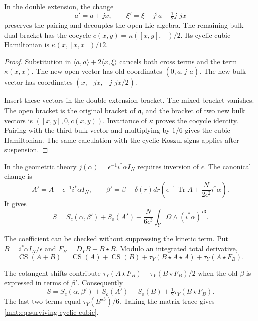 \begin{proposition}\label{mht:prop:inner-double-extension}
In the double extension, the change
\[
 a'=a+jx,\qquad
 \xi'=\xi-j^\dagger a-\tfrac12j^\dagger jx
\]
preserves the pairing and decouples the open Lie algebra.
The remaining bulk-dual bracket has the cocycle
$c(x,y)=\kappa([x,y],-)/2$.
Its cyclic cubic Hamiltonian is $\kappa(x,[x,x])/12$.
\end{proposition}
\begin{proof}
Substitution in $\langle a,a\rangle+2\langle x,\xi\rangle$
cancels both cross terms and the term $\kappa(x,x)$.
The new open vector has old coordinates $(0,a,j^\dagger a)$.
The new bulk vector has coordinates
$(x,-jx,-j^\dagger jx/2)$.

Insert these vectors in the double-extension bracket.
The mixed bracket vanishes. The open bracket is the
original bracket of $\mathfrak a$, and the bracket of two
new bulk vectors is $([x,y],0,c(x,y))$.
Invariance of $\kappa$ proves the cocycle identity.
Pairing with the third bulk vector and multiplying by
$1/6$ gives the cubic Hamiltonian. The same calculation
with the cyclic Koszul signs applies after suspension.
\end{proof}

In the geometric theory $j(\alpha)=\epsilon^{-1}i^*\alpha I_N$
requires inversion of $\epsilon$. The canonical change is
\[
 A'=A+\epsilon^{-1}i^*\alpha I_N,\qquad
 \beta'=\beta-\delta(r)dr
       \left(\epsilon^{-1}\operatorname{Tr}A
                         +\frac{N}{2\epsilon^2}i^*\alpha\right).
\]
It gives
\begin{equation}\label{mht:eq:surviving-cyclic-cubic}
 S=S_c(\alpha,\beta')+S_o(A')
       +\frac{N}{6\epsilon^3}\int_Y\Omega\wedge(i^*\alpha)^{\star3}.
\end{equation}

The coefficient can be checked without suppressing the
kinetic term. Put $B=i^*\alpha I_N/\epsilon$ and
$F_B=D_YB+B\star B$. Modulo an integrated total derivative,
\[
 \operatorname{CS}(A+B)
 =\operatorname{CS}(A)+\operatorname{CS}(B)
       +\tau_Y(B\star A\star A)+\tau_Y(A\star F_B).
\]

The cotangent shifts contribute
$\tau_Y(A\star F_B)+\tau_Y(B\star F_B)/2$ when the old
$\beta$ is expressed in terms of $\beta'$. Consequently
\[
 S=S_c(\alpha,\beta')+S_o(A')
          -S_o(B)+\tfrac12\tau_Y(B\star F_B).
\]
The last two terms equal $\tau_Y(B^{\star3})/6$.
Taking the matrix trace gives
\eqref{mht:eq:surviving-cyclic-cubic}.

